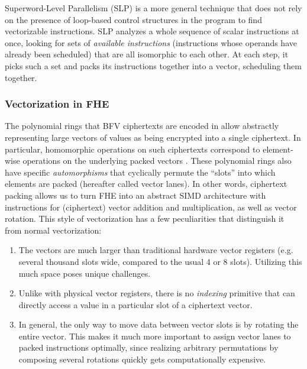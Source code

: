 Superword-Level Parallelism (SLP) is a more general technique that does not rely on the presence of loop-based control structures in the program to find vectorizable instructions.
SLP analyzes a whole sequence of scalar instructions at once, looking for sets of {\em available instructions} (instructions whose operands have already been scheduled) that are all isomorphic to each other.
At each step, it picks such a set and packs its instructions together into a vector, scheduling them together.

\subsubsection*{Vectorization in FHE}
The polynomial rings that BFV ciphertexts are encoded in allow abstractly representing large vectors of values as being encrypted into a single ciphertext.
In particular, homomorphic operations on such ciphertexts correspond to element-wise operations on the underlying packed vectors \cite{BrakerskiPacking}.
These polynomial rings also have specific {\em automorphisms} that cyclically permute the ``slots'' into which elements are packed (hereafter called vector lanes). 
In other words, ciphertext packing allows us to turn FHE into an abstract SIMD architecture with instructions for (ciphertext) vector addition and multiplication, as well as vector rotation.
This style of vectorization has a few peculiarities that distinguish it from normal vectorization:
\begin{enumerate}
    \item The vectors are much larger than traditional hardware vector registers (e.g. several thousand slots wide, compared to the usual 4 or 8 slots). Utilizing this much space poses unique challenges.
    \item Unlike with physical vector registers, there is no {\em indexing} primitive that can directly access a value in a particular slot of a ciphertext vector.
    \item In general, the only way to move data between vector slots is by rotating the entire vector. This makes it much more important to assign vector lanes to packed instructions optimally, since realizing arbitrary permutations by composing several rotations quickly gets computationally expensive. 
\end{enumerate}
